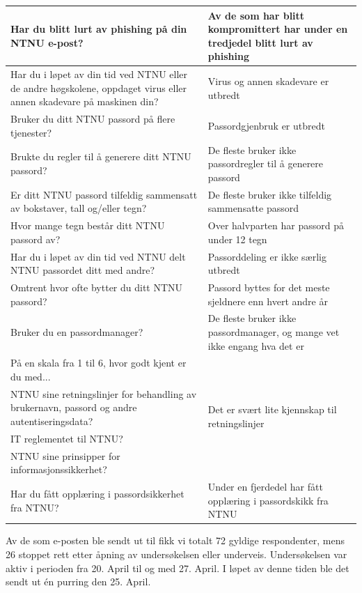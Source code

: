 \begin{table}[H]
\begin{tabular}{|p{20.215em}|p{20.57em}|}
    \hline
    Har du blitt lurt av phishing på din NTNU e-post? & Av de som har blitt kompromittert har under en tredjedel blitt lurt av phishing \\
    \hline
    Har du i løpet av din tid ved NTNU eller de andre høgskolene, oppdaget virus eller annen skadevare på maskinen din? & Virus og annen skadevare er utbredt \\
    \hline
    Bruker du ditt NTNU passord på flere tjenester? & Passordgjenbruk er utbredt \\
    \hline
    Brukte du regler til å generere ditt NTNU passord? & De fleste bruker ikke passordregler til å generere passord \\
    \hline
    Er ditt NTNU passord tilfeldig sammensatt av bokstaver, tall og/eller tegn? & De fleste bruker ikke tilfeldig sammensatte passord \\
    \hline
    Hvor mange tegn består ditt NTNU passord av? & Over halvparten har passord på under 12 tegn \\
    \hline
    Har du i løpet av din tid ved NTNU delt NTNU passordet ditt med andre? & Passorddeling er ikke særlig utbredt \\
    \hline
    Omtrent hvor ofte bytter du ditt NTNU passord? & Passord byttes for det meste sjeldnere enn hvert andre år \\
    \hline
    Bruker du en passordmanager? & De fleste bruker ikke passordmanager, og mange vet ikke engang hva det er \\
    \hline
    På en skala fra 1 til 6, hvor godt kjent er du med... & \multirow{4}[2]{*}{Det er svært lite kjennskap til retningslinjer} \\
    NTNU sine retningslinjer for behandling av brukernavn, passord og andre autentiseringsdata? & \multicolumn{1}{r|}{} \\
    IT reglementet til NTNU? & \multicolumn{1}{r|}{} \\
    NTNU sine prinsipper for informasjonssikkerhet? & \multicolumn{1}{r|}{} \\
    \hline
    Har du fått opplæring i passordsikkerhet fra NTNU? & Under en fjerdedel har fått opplæring i passordskikk fra NTNU \\
    \hline
    \end{tabular}%
  \label{tab:hypoteser}%
\end{table}%

Av de som e-posten ble sendt ut til fikk vi totalt 72 gyldige respondenter, mens 26 stoppet rett etter åpning av undersøkelsen eller underveis. Undersøkelsen var aktiv i perioden fra 20. April til og med 27. April. I løpet av denne tiden ble det sendt ut én purring den 25. April. 

